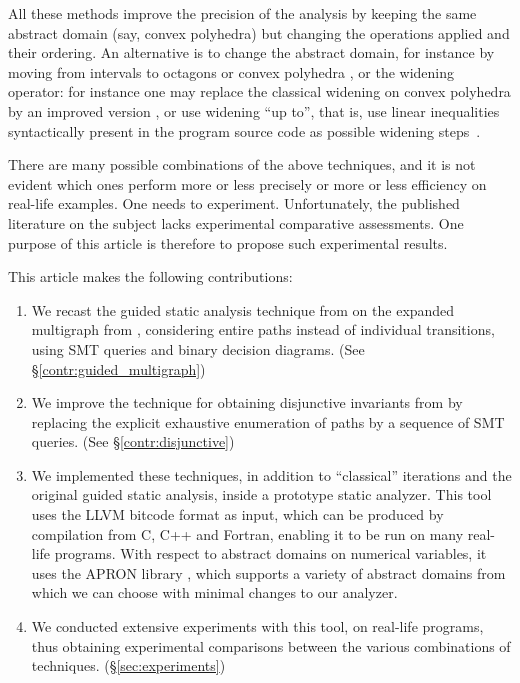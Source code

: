 \documentclass[preprint]{sigplanconf}
\begin{document}
All these methods improve the precision of the analysis by keeping the same abstract domain (say, convex polyhedra) but changing the operations applied and their ordering. An alternative is to change the abstract domain, for instance by moving from intervals to octagons or convex polyhedra \cite{DBLP:journals/lisp/Mine06,Mine_PhD}, or the widening operator: for instance one may replace the classical widening on convex polyhedra \cite{CousotHalbwachs78,Halbwachs_PhD} by an improved version \cite{BagnaraHRZ05SCP}, or use widening ``up to'', that is, use linear inequalities syntactically present in the program source code as possible widening steps~\cite{Polka:FMSD:97}.

There are many possible combinations of the above techniques, and it is not evident which ones perform more or less precisely or more or less efficiency on real-life examples. One needs to experiment. Unfortunately, the published literature on the subject lacks experimental comparative assessments. One purpose of this article is therefore to propose such experimental results.
\medskip

This article makes the following contributions:
\begin{enumerate}
\item We recast the guided static analysis technique from \citet{DBLP:conf/sas/GopanR07} on the expanded multigraph from \citet{Monniaux_Gonnord_SAS11}, considering entire paths instead of individual transitions, using SMT queries and binary decision diagrams.\label{contr:guided_multigraph} (See \S\ref{contr:guided_multigraph})
\item We improve the technique for obtaining disjunctive invariants from \citet{DBLP:conf/pldi/GulwaniZ10} by replacing the explicit exhaustive enumeration of paths by a sequence of SMT queries.\label{contr:disjunctive} (See \S\ref{contr:disjunctive})
\item We implemented these techniques, in addition to ``classical'' iterations and the original guided static analysis, inside a prototype static analyzer.
This tool uses the LLVM bitcode format \cite{Lattner:2004:LCF:977395.977673,LLVM_langref} as input, which can be produced by compilation from C, C++ and Fortran, enabling it to be run on many real-life programs.
With respect to abstract domains on numerical variables, it uses the APRON library \cite{DBLP:conf/cav/JeannetM09}, which supports a variety of abstract domains from which we can choose with minimal changes to our analyzer.
\item We conducted extensive experiments with this tool, on real-life programs, thus obtaining experimental comparisons between the various combinations of techniques. (\S\ref{sec:experiments})
\end{enumerate}
\end{document}
